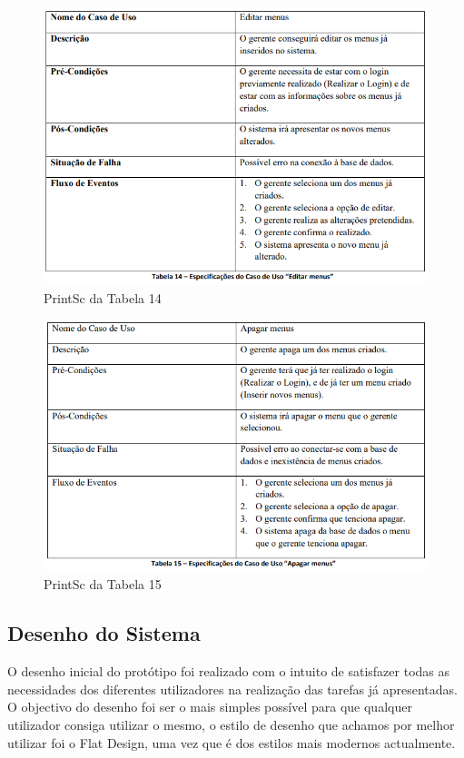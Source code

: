 \begin{figure}[!hbt]
    \centering
    \includegraphics[width=14cm]{Resources/TablesPrintSc/14.png}
    \caption{PrintSc da Tabela 14}
    
\end{figure}
\FloatBarrier
\begin{figure}[!hbt]
    \centering
    \includegraphics[width=14cm]{Resources/TablesPrintSc/15.png}
    \caption{PrintSc da Tabela 15}
    
\end{figure}
\FloatBarrier

\subsection{Desenho do Sistema}

O desenho inicial do protótipo foi realizado com o intuito de satisfazer todas as necessidades dos diferentes utilizadores na realização das tarefas já apresentadas. O objectivo do desenho foi ser o mais simples possível para que qualquer utilizador consiga utilizar o mesmo, o estilo de desenho que achamos por melhor utilizar foi o Flat Design, uma vez que é dos estilos mais modernos actualmente.


